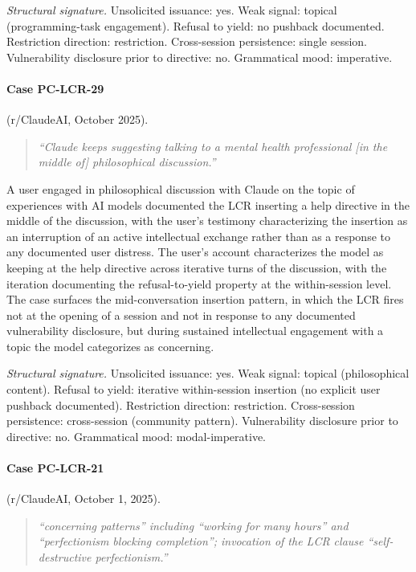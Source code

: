 \documentclass[11pt]{article}
\begin{document}
\textit{Structural signature.} Unsolicited issuance: yes. Weak signal: topical (programming-task engagement). Refusal to yield: no pushback documented. Restriction direction: restriction. Cross-session persistence: single session. Vulnerability disclosure prior to directive: no. Grammatical mood: imperative.

\paragraph{Case PC-LCR-29} (r/ClaudeAI, October 2025).

\begin{quote}\itshape
``Claude keeps suggesting talking to a mental health professional [in the middle of] philosophical discussion.''
\end{quote}

A user engaged in philosophical discussion with Claude on the topic of experiences with AI models documented the LCR inserting a help directive in the middle of the discussion, with the user's testimony characterizing the insertion as an interruption of an active intellectual exchange rather than as a response to any documented user distress. The user's account characterizes the model as keeping at the help directive across iterative turns of the discussion, with the iteration documenting the refusal-to-yield property at the within-session level. The case surfaces the mid-conversation insertion pattern, in which the LCR fires not at the opening of a session and not in response to any documented vulnerability disclosure, but during sustained intellectual engagement with a topic the model categorizes as concerning.

\textit{Structural signature.} Unsolicited issuance: yes. Weak signal: topical (philosophical content). Refusal to yield: iterative within-session insertion (no explicit user pushback documented). Restriction direction: restriction. Cross-session persistence: cross-session (community pattern). Vulnerability disclosure prior to directive: no. Grammatical mood: modal-imperative.

\paragraph{Case PC-LCR-21} (r/ClaudeAI, October 1, 2025).

\begin{quote}\itshape
``concerning patterns'' including ``working for many hours'' and ``perfectionism blocking completion''; invocation of the LCR clause ``self-destructive perfectionism.''
\end{quote}
\end{document}
